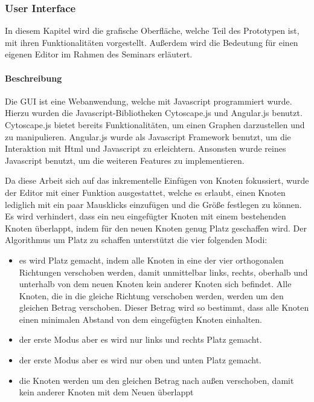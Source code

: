 \subsubsection{User Interface}

In diesem Kapitel wird die grafische Oberfläche, welche Teil des Prototypen ist, mit ihren
Funktionalitäten vorgestellt. Außerdem wird die Bedeutung für einen eigenen Editor im
Rahmen des Seminars erläutert.

\paragraph{Beschreibung}

Die GUI ist eine Webanwendung, welche mit Javascript programmiert wurde. Hierzu wurden
die Javascript-Bibliotheken Cytoscape.js\cite{cytoscape} und Angular.js\cite{angularjs} benutzt. Cytoscape.js bietet bereits
Funktionalitäten, um einen Graphen darzustellen und zu manipulieren. Angular.js wurde als
Javascript Framework benutzt, um die Interaktion mit Html und Javascript zu erleichtern.
Ansonsten wurde reines Javascript benutzt, um die weiteren Features zu implementieren.

Da diese Arbeit sich auf das inkrementelle Einfügen von Knoten fokussiert, wurde der Editor
mit einer Funktion ausgestattet, welche es erlaubt, einen Knoten lediglich mit ein paar
Mausklicks einzufügen und die Größe festlegen zu können. Es wird verhindert, dass ein neu
eingefügter Knoten mit einem bestehenden Knoten überlappt, indem für den neuen Knoten
genug Platz geschaffen wird. Der Algorithmus um Platz zu schaffen unterstützt die vier
folgenden Modi:

\begin{itemize}
	\item es wird Platz gemacht, indem alle Knoten in eine der vier orthogonalen Richtungen
verschoben werden, damit unmittelbar links, rechts, oberhalb und unterhalb von dem
neuen Knoten kein anderer Knoten sich befindet. Alle Knoten, die in die gleiche
Richtung verschoben werden, werden um den gleichen Betrag verschoben. Dieser
Betrag wird so bestimmt, dass alle Knoten einen minimalen Abstand von dem
eingefügten Knoten einhalten.
	\item der erste Modus aber es wird nur links und rechts Platz gemacht.
	\item der erste Modus aber es wird nur oben und unten Platz gemacht.
	\item die Knoten werden um den gleichen Betrag nach außen verschoben, damit kein
anderer Knoten mit dem Neuen überlappt
\end{itemize}

